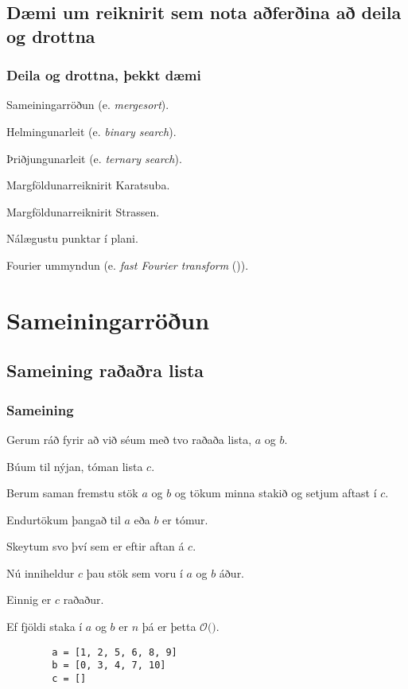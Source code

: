 \subsection{Dæmi um reiknirit sem nota aðferðina að deila og drottna}
{
    \frametitle{Deila og drottna, þekkt dæmi}
    {
        \item<1-> Sameiningarröðun (e. \emph{mergesort}).
        \item<2-> Helmingunarleit (e. \emph{binary search}).
        \item<3-> Þriðjungunarleit (e. \emph{ternary search}).
        \item<4-> Margföldunarreiknirit Karatsuba.
        \item<5-> Margföldunarreiknirit Strassen.
        \item<6-> Nálægustu punktar í plani.
        \item<7-> Fourier ummyndun (e. \emph{fast Fourier transform} ()).
    }
}

\section{Sameiningarröðun}
\subsection{Sameining raðaðra lista}
{
    \frametitle{Sameining}
    {
        \item<1-> Gerum ráð fyrir að við séum með tvo raðaða lista, $a$ og $b$.
        \item<2-> Búum til nýjan, tóman lista $c$.
        \item<3-> Berum saman fremstu stök $a$ og $b$ og tökum minna stakið og setjum aftast í $c$.
        \item<4-> Endurtökum þangað til $a$ eða $b$ er tómur.
        \item<5-> Skeytum svo því sem er eftir aftan á $c$.
        \item<6-> Nú inniheldur $c$ þau stök sem voru í $a$ og $b$ áður.
        \item<7-> Einnig er $c$ raðaður.
        \item<8-> Ef fjöldi staka í $a$ og $b$ er $n$ þá er þetta $\mathcal{O}($$)$.
    }
}

{ \begin{verbatim}
        a = [1, 2, 5, 6, 8, 9]
        b = [0, 3, 4, 7, 10]
        c = []
\end{verbatim} }

